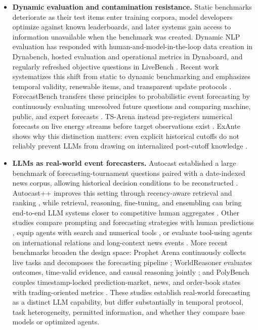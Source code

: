 \documentclass[sigconf,review]{acmart}
\newenvironment{draftbullets}
  {\begin{itemize}[leftmargin=1.25em,itemsep=1.5pt,topsep=2pt,parsep=0pt,partopsep=0pt]}
  {\end{itemize}}
\begin{document}
\begin{draftbullets}
  \item \textbf{Dynamic evaluation and contamination resistance.} Static benchmarks deteriorate as
  their test items enter training corpora, model developers optimize against known leaderboards, and
  later systems gain access to information unavailable when the benchmark was created. Dynamic NLP
  evaluation has responded with human-and-model-in-the-loop data creation in Dynabench, hosted
  evaluation and operational metrics in Dynaboard, and regularly refreshed objective questions in
  LiveBench \citep{dynabench,dynaboard,livebench}. Recent work systematizes this shift from static to
  dynamic benchmarking and emphasizes temporal validity, renewable items, and transparent update
  protocols \citep{chen_etal_2025_contamination}. ForecastBench transfers these principles to
  probabilistic event forecasting by continuously evaluating unresolved future questions and
  comparing machine, public, and expert forecasts \citep{forecastbench}. TS-Arena instead
  pre-registers numerical forecasts on live energy streams before target observations exist
  \citep{tsarena}. ExAnte shows why this distinction matters: even explicit historical cutoffs do not
  reliably prevent LLMs from drawing on internalized post-cutoff knowledge \citep{exante}.

  \item \textbf{LLMs as real-world event forecasters.} Autocast established a large benchmark of
  forecasting-tournament questions paired with a date-indexed news corpus, allowing historical
  decision conditions to be reconstructed \citep{autocast}. Autocast++ improves this setting through
  recency-aware retrieval and ranking \citep{autocastpp}, while retrieval, reasoning, fine-tuning, and
  ensembling can bring end-to-end LLM systems closer to competitive human aggregates
  \citep{halawi_etal_2024}. Other studies compare prompting and forecasting strategies with human
  predictions \citep{pratt_etal_2024}, equip agents with search and numerical tools
  \citep{hsieh_etal_2024}, or evaluate tool-using agents on international relations and long-context
  news events \citep{mirai,tcelongbench}. More recent benchmarks broaden the design space: Prophet
  Arena continuously collects live tasks and decomposes the forecasting pipeline
  \citep{prophetarena}; WorldReasoner evaluates outcomes, time-valid evidence, and causal reasoning
  jointly \citep{worldreasoner}; and PolyBench couples timestamp-locked prediction-market, news, and
  order-book states with trading-oriented metrics \citep{polybench}. These studies establish
  real-world forecasting as a distinct LLM capability, but differ substantially in temporal protocol,
  task heterogeneity, permitted information, and whether they compare base models or optimized agents.


\end{draftbullets}
\end{document}
